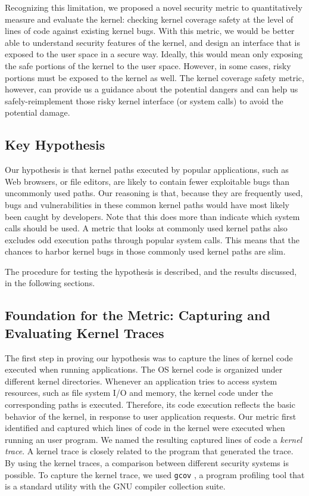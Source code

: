 Recognizing this limitation, we proposed a novel security metric to
quantitatively measure and evaluate the kernel: 
checking kernel coverage safety at the level of lines of code against
existing kernel bugs. 
With this metric, we would be better able to understand security features
of the kernel, 
and design an interface that is exposed to the user space in a secure way.
Ideally, 
this would mean only exposing the safe portions of the kernel to the user
space. 
However, in some cases, risky portions must be exposed to the kernel as
well. 
The kernel coverage safety metric, however, can provide us a guidance 
about the potential dangers and 
can help us safely-reimplement those risky kernel interface (or system
calls) to avoid the potential damage.






\subsection{Key Hypothesis}

Our hypothesis is that kernel paths executed by popular applications, 
such as Web browsers, or file editors, are likely to contain fewer
exploitable bugs 
than uncommonly used paths. Our reasoning is that, because they are
frequently used, 
bugs and vulnerabilities in these common kernel paths
would have most likely been caught by developers. 
Note that this does more than indicate which system calls should be used. 
A metric that looks at commonly used kernel paths also excludes odd
execution paths 
through popular system calls. 
This means that the chances to harbor kernel bugs in those commonly used
kernel paths are slim. 

The procedure for testing the hypothesis is described, and the results
discussed, in the following sections. 

\subsection{Foundation for the Metric: Capturing and Evaluating Kernel
Traces}

The first step in proving our hypothesis was to capture the lines of kernel
code executed 
when running applications. The OS kernel code is organized under different
kernel directories. 
Whenever an application tries to access system resources, such as file
system I/O and memory, 
the kernel code under the corresponding paths is executed. Therefore, 
its code execution reflects the basic behavior of the kernel, in response
to user application requests. 
Our metric first identified and captured which lines of code in the kernel
were executed 
when running an user program. We named the resulting captured lines of
code a \textit{kernel trace}. 
A kernel trace is closely related to the program that generated the trace. 
By using the kernel traces, a comparison between different
security systems is possible. 
To capture the kernel trace, we used \texttt{gcov} \cite{gcov}, a program profiling
tool that is a standard utility with the GNU compiler collection 
suite.


